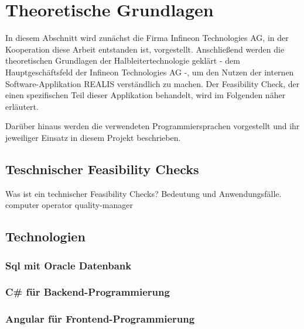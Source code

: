 \chapter{Theoretische Grundlagen}\label{Chap:TheoretischeGrundlagen}
In diesem Abschnitt wird zunächst die Firma Infineon Technologies AG, in der Kooperation diese Arbeit entstanden ist, vorgestellt. Anschließend werden die theoretischen Grundlagen der Halbleitertechnologie geklärt - dem Hauptgeschäftsfeld der Infineon Technologies AG -, um den Nutzen der internen Software-Applikation \ac{REALIS} verständlich zu machen. Der Feasibility Check, der einen spezifischen Teil dieser Applikation behandelt, wird im Folgenden näher erläutert.

Darüber hinaus werden die verwendeten Programmiersprachen vorgestellt und ihr jeweiliger Einsatz in diesem Projekt beschrieben.








\section{Teschnischer Feasibility Checks}
Was ist ein technischer Feasibility Checks? Bedeutung und Anwendungsfälle. \gls{computer} \gls{operator} \gls{quality-manager}

\section{Technologien}

\subsection{Sql mit Oracle Datenbank}

\subsection{C\# für Backend-Programmierung}

\subsection{Angular für Frontend-Programmierung}